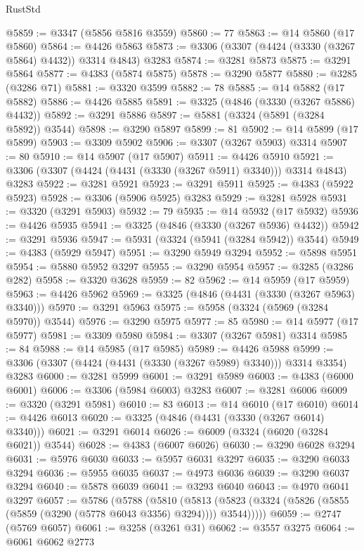 \begin{lexlean}{RustStd}
\begin{coremodule}
@5859 := @3347 (@5856 @5816 @3559)
@5860 := 77
@5863 := @14 @5860 (@17 @5860)
@5864 := @4426 @5863
@5873 := @3306 (@3307 (@4424 (@3330 (@3267 @5864) @4432)) @3314 @4843) @3283
@5874 := @3281 @5873
@5875 := @3291 @5864
@5877 := @4383 (@5874 @5875)
@5878 := @3290 @5877
@5880 := @3285 (@3286 @71)
@5881 := @3320 @3599
@5882 := 78
@5885 := @14 @5882 (@17 @5882)
@5886 := @4426 @5885
@5891 := @3325 (@4846 (@3330 (@3267 @5886) @4432))
@5892 := @3291 @5886
@5897 := @5881 (@3324 (@5891 (@3284 @5892)) @3544)
@5898 := @3290 @5897
@5899 := 81
@5902 := @14 @5899 (@17 @5899)
@5903 := @3309 @5902
@5906 := @3307 (@3267 @5903) @3314
@5907 := 80
@5910 := @14 @5907 (@17 @5907)
@5911 := @4426 @5910
@5921 := @3306 (@3307 (@4424 (@4431 (@3330 (@3267 @5911) @3340))) @3314 @4843) @3283
@5922 := @3281 @5921
@5923 := @3291 @5911
@5925 := @4383 (@5922 @5923)
@5928 := @3306 (@5906 @5925) @3283
@5929 := @3281 @5928
@5931 := @3320 (@3291 @5903)
@5932 := 79
@5935 := @14 @5932 (@17 @5932)
@5936 := @4426 @5935
@5941 := @3325 (@4846 (@3330 (@3267 @5936) @4432))
@5942 := @3291 @5936
@5947 := @5931 (@3324 (@5941 (@3284 @5942)) @3544)
@5949 := @4383 (@5929 @5947)
@5951 := @3290 @5949 @3294
@5952 := @5898 @5951
@5954 := @5880 @5952 @3297
@5955 := @3290 @5954
@5957 := @3285 (@3286 @282)
@5958 := @3320 @3628
@5959 := 82
@5962 := @14 @5959 (@17 @5959)
@5963 := @4426 @5962
@5969 := @3325 (@4846 (@4431 (@3330 (@3267 @5963) @3340)))
@5970 := @3291 @5963
@5975 := @5958 (@3324 (@5969 (@3284 @5970)) @3544)
@5976 := @3290 @5975
@5977 := 85
@5980 := @14 @5977 (@17 @5977)
@5981 := @3309 @5980
@5984 := @3307 (@3267 @5981) @3314
@5985 := 84
@5988 := @14 @5985 (@17 @5985)
@5989 := @4426 @5988
@5999 := @3306 (@3307 (@4424 (@4431 (@3330 (@3267 @5989) @3340))) @3314 @3354) @3283
@6000 := @3281 @5999
@6001 := @3291 @5989
@6003 := @4383 (@6000 @6001)
@6006 := @3306 (@5984 @6003) @3283
@6007 := @3281 @6006
@6009 := @3320 (@3291 @5981)
@6010 := 83
@6013 := @14 @6010 (@17 @6010)
@6014 := @4426 @6013
@6020 := @3325 (@4846 (@4431 (@3330 (@3267 @6014) @3340)))
@6021 := @3291 @6014
@6026 := @6009 (@3324 (@6020 (@3284 @6021)) @3544)
@6028 := @4383 (@6007 @6026)
@6030 := @3290 @6028 @3294
@6031 := @5976 @6030
@6033 := @5957 @6031 @3297
@6035 := @3290 @6033 @3294
@6036 := @5955 @6035
@6037 := @4973 @6036
@6039 := @3290 @6037 @3294
@6040 := @5878 @6039
@6041 := @3293 @6040
@6043 := @4970 @6041 @3297
@6057 := @5786
    (@5788
      (@5810
        (@5813 (@5823 (@3324 (@5826 (@5855 (@5859 (@3290 (@5778 @6043 @3356) @3294)))) @3544)))))
@6059 := @2747 (@5769 @6057)
@6061 := @3258 (@3261 @31)
@6062 := @3557 @3275
@6064 := @6061 @6062 @2773

\end{coremodule}
\end{lexlean}
